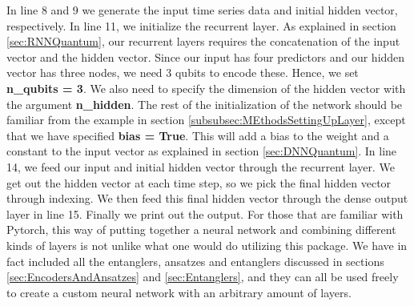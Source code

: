 In line 8 and 9 we generate the input time series data and initial hidden vector, respectively. In line 11, we initialize the recurrent layer. As explained in section \ref{sec:RNNQuantum}, our recurrent layers requires the concatenation of the input vector and the hidden vector. Since our input has four predictors and our hidden vector has three nodes, we need 3 qubits to encode these. Hence, we set \textbf{n\_qubits = 3}. We also need to specify the dimension of the hidden vector with the argument \textbf{n\_hidden}. The rest of the initialization of the network should be familiar from the example in section \ref{subsubsec:MEthodsSettingUpLayer}, except that we have specified \textbf{bias = True}. This will add a bias to the weight and a constant to the input vector as explained in section \ref{sec:DNNQuantum}.
In line 14, we feed our input and initial hidden vector through the recurrent layer. We get out the hidden vector at each time step, so we pick the final hidden vector through indexing. We then feed this final hidden vector through the dense output layer in line 15. Finally we print out the output.
For those that are familiar with Pytorch, this way of putting together a neural network and combining different kinds of layers is not unlike what one would do utilizing this package. We have in fact included all the entanglers, ansatzes and entanglers discussed in sections \ref{sec:EncodersAndAnsatzes} and \ref{sec:Entanglers}, and they can all be used freely to create a custom neural network with an arbitrary amount of layers.


